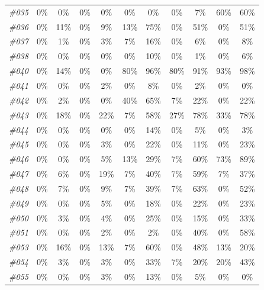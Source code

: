 \begin{table}[t]
\begin{tabular}{ccccccccccc}
    \textit{\#035} & 0\%   & 0\%   & 0\%   & 0\%   & 0\%   & 0\%   & 0\%   & 7\%   & 60\%  & 60\% \\
    \textit{\#036} & 0\%   & 11\%  & 0\%   & 9\%   & 13\%  & 75\%  & 0\%   & 51\%  & 0\%   & 51\% \\
    \textit{\#037} & 0\%   & 1\%   & 0\%   & 3\%   & 7\%   & 16\%  & 0\%   & 6\%   & 0\%   & 8\% \\
    \textit{\#038} & 0\%   & 0\%   & 0\%   & 0\%   & 0\%   & 10\%  & 0\%   & 1\%   & 0\%   & 6\% \\
    \textit{\#040} & 0\%   & 14\%  & 0\%   & 0\%   & 80\%  & 96\%  & 80\%  & 91\%  & 93\%  & 98\% \\
    \textit{\#041} & 0\%   & 0\%   & 0\%   & 2\%   & 0\%   & 8\%   & 0\%   & 2\%   & 0\%   & 0\% \\
    \textit{\#042} & 0\%   & 2\%   & 0\%   & 0\%   & 40\%  & 65\%  & 7\%   & 22\%  & 0\%   & 22\% \\
    \textit{\#043} & 0\%   & 18\%  & 0\%   & 22\%  & 7\%   & 58\%  & 27\%  & 78\%  & 33\%  & 78\% \\
    \textit{\#044} & 0\%   & 0\%   & 0\%   & 0\%   & 0\%   & 14\%  & 0\%   & 5\%   & 0\%   & 3\% \\
    \textit{\#045} & 0\%   & 0\%   & 0\%   & 3\%   & 0\%   & 22\%  & 0\%   & 11\%  & 0\%   & 23\% \\
    \textit{\#046} & 0\%   & 0\%   & 0\%   & 5\%   & 13\%  & 29\%  & 7\%   & 60\%  & 73\%  & 89\% \\
    \textit{\#047} & 0\%   & 6\%   & 0\%   & 19\%  & 7\%   & 40\%  & 7\%   & 59\%  & 7\%   & 37\% \\
    \textit{\#048} & 0\%   & 7\%   & 0\%   & 9\%   & 7\%   & 39\%  & 7\%   & 63\%  & 0\%   & 52\% \\
    \textit{\#049} & 0\%   & 0\%   & 0\%   & 5\%   & 0\%   & 18\%  & 0\%   & 22\%  & 0\%   & 23\% \\
    \textit{\#050} & 0\%   & 3\%   & 0\%   & 4\%   & 0\%   & 25\%  & 0\%   & 15\%  & 0\%   & 33\% \\
    \textit{\#051} & 0\%   & 0\%   & 0\%   & 2\%   & 0\%   & 2\%   & 0\%   & 40\%  & 0\%   & 58\% \\
    \textit{\#053} & 0\%   & 16\%  & 0\%   & 13\%  & 7\%   & 60\%  & 0\%   & 48\%  & 13\%  & 20\% \\
    \textit{\#054} & 0\%   & 3\%   & 0\%   & 3\%   & 0\%   & 33\%  & 7\%   & 20\%  & 20\%  & 43\% \\
    \textit{\#055} & 0\%   & 0\%   & 0\%   & 3\%   & 0\%   & 13\%  & 0\%   & 5\%   & 0\%   & 0\% \\
    \bottomrule
    \end{tabular}%
  \label{tab:exp_AgilexCobotMagic_1}%
\end{table}%


